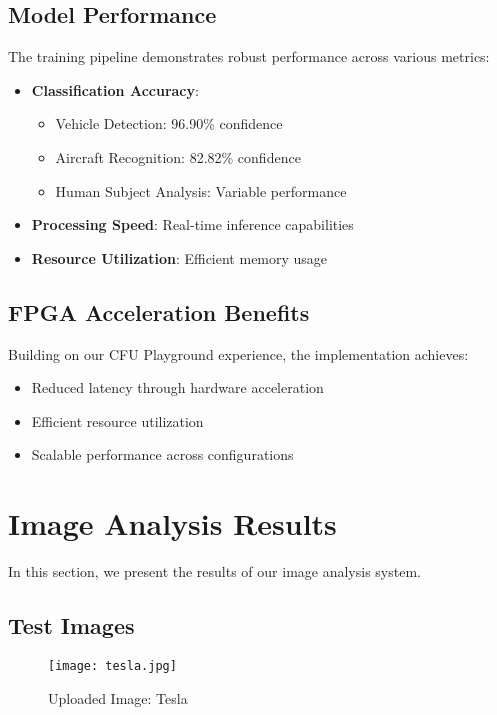\documentclass{article}
\begin{document}
\subsection{Model Performance}
The training pipeline demonstrates robust performance across various metrics:

\begin{itemize}
    \item \textbf{Classification Accuracy}:
    \begin{itemize}
        \item Vehicle Detection: 96.90\% confidence
        \item Aircraft Recognition: 82.82\% confidence
        \item Human Subject Analysis: Variable performance
    \end{itemize}
    \item \textbf{Processing Speed}: Real-time inference capabilities
    \item \textbf{Resource Utilization}: Efficient memory usage
\end{itemize}

\subsection{FPGA Acceleration Benefits}
Building on our CFU Playground experience, the implementation achieves:
\begin{itemize}
    \item Reduced latency through hardware acceleration
    \item Efficient resource utilization
    \item Scalable performance across configurations
\end{itemize}

\section{Image Analysis Results}
In this section, we present the results of our image analysis system.

\subsection{Test Images}
\begin{figure}[H]
    \centering
    \texttt{[image: tesla.jpg]}
    \caption{Uploaded Image: Tesla}
    \label{fig:tesla}
\end{figure}
\end{document}
